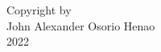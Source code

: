 \chapter*{}
\begin{center}
\null
\vfill
Copyright by\\ 
John Alexander Osorio Henao\\ 
2022\\
\end{center}